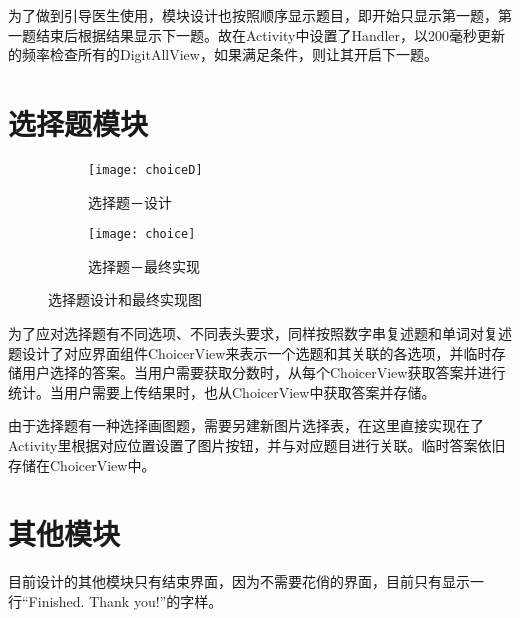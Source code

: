 为了做到引导医生使用，模块设计也按照顺序显示题目，即开始只显示第一题，第一题结束后根据结果显示下一题。故在Activity中设置了Handler，以200毫秒更新的频率检查所有的DigitAllView，如果满足条件，则让其开启下一题。

\section{选择题模块}

\begin{figure}[h]
\centering%
\begin{subfigure}{6cm}
\texttt{[image: choiceD]}
\caption{选择题－设计}
\end{subfigure}
\hspace{4em}%
\begin{subfigure}{6cm}
\texttt{[image: choice]}
\caption{选择题－最终实现}
\end{subfigure}
\caption{选择题设计和最终实现图}
\label{fig:big1-subfigure}
\end{figure}

为了应对选择题有不同选项、不同表头要求，同样按照数字串复述题和单词对复述题设计了对应界面组件ChoicerView来表示一个选题和其关联的各选项，并临时存储用户选择的答案。当用户需要获取分数时，从每个ChoicerView获取答案并进行统计。当用户需要上传结果时，也从ChoicerView中获取答案并存储。

由于选择题有一种选择画图题，需要另建新图片选择表，在这里直接实现在了Activity里根据对应位置设置了图片按钮，并与对应题目进行关联。临时答案依旧存储在ChoicerView中。


\section{其他模块}

目前设计的其他模块只有结束界面，因为不需要花俏的界面，目前只有显示一行“Finished. Thank you!”的字样。


